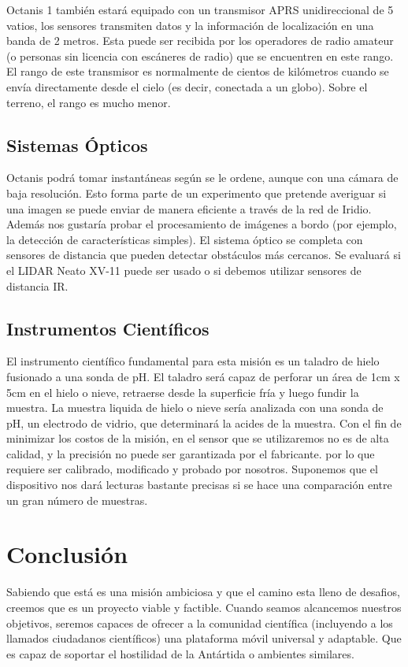 \documentclass[a4paper,12pt]{article}
\begin{document}
Octanis 1 también estará equipado con un transmisor APRS unidireccional de 5 vatios, los sensores transmiten datos y la información de localización en una banda de 2 metros. Esta puede ser recibida por los operadores de radio amateur (o personas sin licencia con escáneres de radio) que se encuentren en este rango. El rango de este transmisor es normalmente de cientos de kilómetros cuando se envía directamente desde el cielo (es decir, conectada a un globo). Sobre el terreno, el rango es mucho menor.


\subsection{Sistemas Ópticos}
Octanis podrá tomar instantáneas según se le ordene, aunque con una cámara de baja resolución. Esto forma parte de un experimento que pretende averiguar si una imagen se puede enviar de manera eficiente a través de la red de Iridio. Además nos gustaría probar el procesamiento de imágenes a bordo (por ejemplo, la detección de características simples). El sistema óptico se completa con sensores de distancia que pueden detectar obstáculos más cercanos. Se evaluará si el LIDAR Neato XV-11 \cite{lidar} puede ser usado o si debemos utilizar sensores de distancia IR.


\subsection{Instrumentos Científicos}
El instrumento científico fundamental para esta misión es un taladro de hielo fusionado a una sonda de pH. El taladro será capaz de perforar un área de 1cm x 5cm en el hielo o nieve, retraerse desde la superficie fría y luego fundir la muestra. La muestra liquida de hielo o nieve sería analizada con una sonda de pH, un electrodo de vidrio, que determinará la acides de la muestra. Con el fin de minimizar los costos de la misión, en el sensor que se utilizaremos no es de alta calidad, y la precisión no puede ser garantizada por el fabricante. por lo que requiere ser calibrado, modificado y probado por nosotros. Suponemos que el dispositivo nos dará lecturas bastante precisas si se hace una comparación entre un gran número de muestras.

\pagebreak

\section{Conclusión}
Sabiendo que está es una misión ambiciosa y que el camino esta lleno de desafios, creemos que es un proyecto viable y factible. Cuando seamos alcancemos nuestros objetivos, seremos capaces de ofrecer a la comunidad científica (incluyendo a los llamados ciudadanos científicos) una plataforma móvil universal y adaptable. Que es capaz de soportar el hostilidad de la Antártida o ambientes similares.\\
\end{document}
